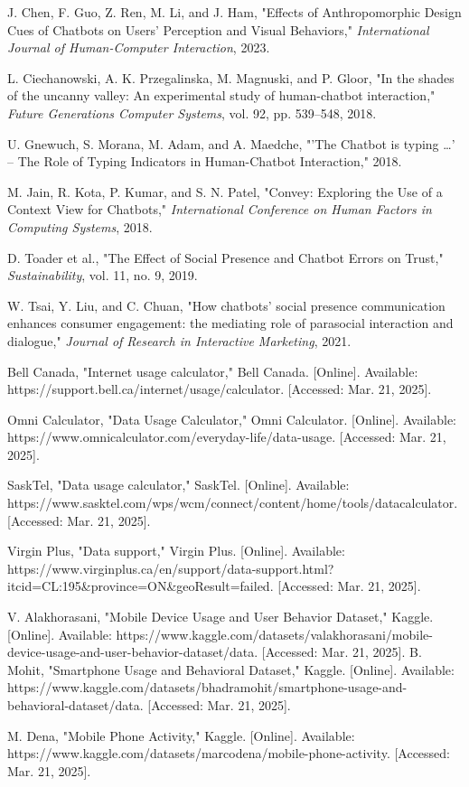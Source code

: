 \documentclass[conference]{IEEEtran}
\begin{document}
\begin{thebibliography}{00}
 J. Chen, F. Guo, Z. Ren, M. Li, and J. Ham, "Effects of Anthropomorphic Design Cues of Chatbots on Users' Perception and Visual Behaviors," \textit{International Journal of Human-Computer Interaction}, 2023.

 L. Ciechanowski, A. K. Przegalinska, M. Magnuski, and P. Gloor, "In the shades of the uncanny valley: An experimental study of human-chatbot interaction," \textit{Future Generations Computer Systems}, vol. 92, pp. 539–548, 2018.

 U. Gnewuch, S. Morana, M. Adam, and A. Maedche, "'The Chatbot is typing …' – The Role of Typing Indicators in Human-Chatbot Interaction," 2018.

 M. Jain, R. Kota, P. Kumar, and S. N. Patel, "Convey: Exploring the Use of a Context View for Chatbots," \textit{International Conference on Human Factors in Computing Systems}, 2018.

 D. Toader et al., "The Effect of Social Presence and Chatbot Errors on Trust," \textit{Sustainability}, vol. 11, no. 9, 2019.

 W. Tsai, Y. Liu, and C. Chuan, "How chatbots' social presence communication enhances consumer engagement: the mediating role of parasocial interaction and dialogue," \textit{Journal of Research in Interactive Marketing}, 2021.

 Bell Canada, "Internet usage calculator," Bell Canada. [Online]. Available: https://support.bell.ca/internet/usage/calculator. [Accessed: Mar. 21, 2025].

 Omni Calculator, "Data Usage Calculator," Omni Calculator. [Online]. Available: https://www.omnicalculator.com/everyday-life/data-usage. [Accessed: Mar. 21, 2025].

 SaskTel, "Data usage calculator," SaskTel. [Online]. Available: https://www.sasktel.com/wps/wcm/connect/content/home/tools/datacalculator. [Accessed: Mar. 21, 2025].

 Virgin Plus, "Data support," Virgin Plus. [Online]. Available: https://www.virginplus.ca/en/support/data-support.html?itcid=CL:195\&province=ON\&geoResult=failed. [Accessed: Mar. 21, 2025].

 V. Alakhorasani, "Mobile Device Usage and User Behavior Dataset," Kaggle. [Online]. Available: https://www.kaggle.com/datasets/valakhorasani/mobile-device-usage-and-user-behavior-dataset/data. [Accessed: Mar. 21, 2025].
 B. Mohit, "Smartphone Usage and Behavioral Dataset," Kaggle. [Online]. Available: https://www.kaggle.com/datasets/bhadramohit/smartphone-usage-and-behavioral-dataset/data. [Accessed: Mar. 21, 2025].

 M. Dena, "Mobile Phone Activity," Kaggle. [Online]. Available: https://www.kaggle.com/datasets/marcodena/mobile-phone-activity. [Accessed: Mar. 21, 2025].

\end{thebibliography}
\end{document}
